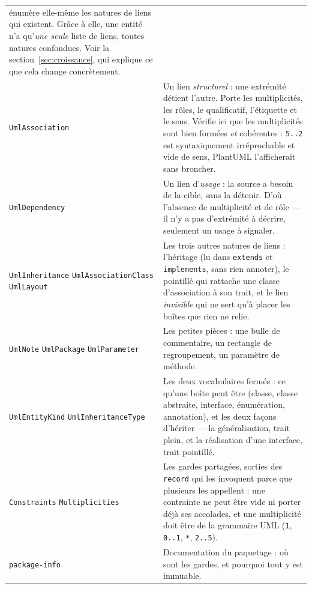 \documentclass[12pt, a4paper]{article}
\begin{document}
\begin{longtable}{L{4.2cm} L{10cm}}
énumère elle-même les natures de liens qui existent. Grâce à elle, une entité n'a qu'\emph{une
seule} liste de liens, toutes natures confondues. Voir la section~\ref{sec:croissance}, qui
explique ce que cela change concrètement. \\
\addlinespace
\texttt{UmlAssociation} &
Un lien \emph{structurel} : une extrémité détient l'autre. Porte les multiplicités, les rôles,
le qualificatif, l'étiquette et le sens. Vérifie ici que les multiplicités sont bien formées
\emph{et} cohérentes : \texttt{5..2} est syntaxiquement irréprochable et vide de sens, PlantUML
l'afficherait sans broncher. \\
\addlinespace
\texttt{UmlDependency} &
Un lien d'\emph{usage} : la source a besoin de la cible, sans la détenir. D'où l'absence de
multiplicité et de rôle — il n'y a pas d'extrémité à décrire, seulement un usage à signaler. \\
\addlinespace
\texttt{UmlInheritance} \newline \texttt{UmlAssociationClass} \newline \texttt{UmlLayout} &
Les trois autres natures de liens : l'héritage (lu dans \texttt{extends} et \texttt{implements},
sans rien annoter), le pointillé qui rattache une classe d'association à son trait, et le lien
\emph{invisible} qui ne sert qu'à placer les boîtes que rien ne relie. \\
\addlinespace
\texttt{UmlNote} \newline \texttt{UmlPackage} \newline \texttt{UmlParameter} &
Les petites pièces : une bulle de commentaire, un rectangle de regroupement, un paramètre de
méthode. \\
\addlinespace
\texttt{UmlEntityKind} \newline \texttt{UmlInheritanceType} &
Les deux vocabulaires fermés : ce qu'une boîte peut être (classe, classe abstraite, interface,
énumération, annotation), et les deux façons d'hériter — la généralisation, trait plein, et la
réalisation d'une interface, trait pointillé. \\
\addlinespace
\texttt{Constraints} \newline \texttt{Multiplicities} &
Les gardes partagées, sorties des \texttt{record} qui les invoquent parce que plusieurs les
appellent : une contrainte ne peut être vide ni porter déjà ses accolades, et une multiplicité
doit être de la grammaire UML (\texttt{1}, \texttt{0..1}, \texttt{*}, \texttt{2..5}). \\
\addlinespace
\texttt{package-info} &
Documentation du paquetage : où sont les gardes, et pourquoi tout y est immuable. \\
\bottomrule
\end{longtable}
\end{document}
